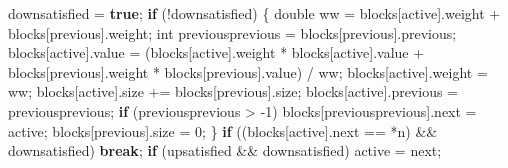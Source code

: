 \documentclass[
  12pt,
  letterpaper,
  DIV=11,
  numbers=noendperiod]{scrreprt}
\newenvironment{Shaded}{\begin{snugshade}}{\end{snugshade}}
\newcommand{\ControlFlowTok}[1]{\textcolor[rgb]{0.00,0.23,0.31}{\textbf{#1}}}
\newcommand{\DataTypeTok}[1]{\textcolor[rgb]{0.68,0.00,0.00}{#1}}
\newcommand{\DecValTok}[1]{\textcolor[rgb]{0.68,0.00,0.00}{#1}}
\newcommand{\KeywordTok}[1]{\textcolor[rgb]{0.00,0.23,0.31}{\textbf{#1}}}
\newcommand{\NormalTok}[1]{\textcolor[rgb]{0.00,0.23,0.31}{#1}}
\newcommand{\OperatorTok}[1]{\textcolor[rgb]{0.37,0.37,0.37}{#1}}
\theoremstyle{remark}
\begin{document}
\begin{Shaded}
\begin{Highlighting}[]
\NormalTok{            downsatisfied }\OperatorTok{=} \KeywordTok{true}\OperatorTok{;}
        \ControlFlowTok{if} \OperatorTok{(!}\NormalTok{downsatisfied}\OperatorTok{)} \OperatorTok{\{}
            \DataTypeTok{double}\NormalTok{ ww }\OperatorTok{=}\NormalTok{ blocks}\OperatorTok{[}\NormalTok{active}\OperatorTok{].}\NormalTok{weight }\OperatorTok{+}\NormalTok{ blocks}\OperatorTok{[}\NormalTok{previous}\OperatorTok{].}\NormalTok{weight}\OperatorTok{;}
            \DataTypeTok{int}\NormalTok{ previousprevious }\OperatorTok{=}\NormalTok{ blocks}\OperatorTok{[}\NormalTok{previous}\OperatorTok{].}\NormalTok{previous}\OperatorTok{;}
\NormalTok{            blocks}\OperatorTok{[}\NormalTok{active}\OperatorTok{].}\NormalTok{value }\OperatorTok{=}
                \OperatorTok{(}\NormalTok{blocks}\OperatorTok{[}\NormalTok{active}\OperatorTok{].}\NormalTok{weight }\OperatorTok{*}\NormalTok{ blocks}\OperatorTok{[}\NormalTok{active}\OperatorTok{].}\NormalTok{value }\OperatorTok{+}
\NormalTok{                 blocks}\OperatorTok{[}\NormalTok{previous}\OperatorTok{].}\NormalTok{weight }\OperatorTok{*}\NormalTok{ blocks}\OperatorTok{[}\NormalTok{previous}\OperatorTok{].}\NormalTok{value}\OperatorTok{)} \OperatorTok{/}
\NormalTok{                ww}\OperatorTok{;}
\NormalTok{            blocks}\OperatorTok{[}\NormalTok{active}\OperatorTok{].}\NormalTok{weight }\OperatorTok{=}\NormalTok{ ww}\OperatorTok{;}
\NormalTok{            blocks}\OperatorTok{[}\NormalTok{active}\OperatorTok{].}\NormalTok{size }\OperatorTok{+=}\NormalTok{ blocks}\OperatorTok{[}\NormalTok{previous}\OperatorTok{].}\NormalTok{size}\OperatorTok{;}
\NormalTok{            blocks}\OperatorTok{[}\NormalTok{active}\OperatorTok{].}\NormalTok{previous }\OperatorTok{=}\NormalTok{ previousprevious}\OperatorTok{;}
            \ControlFlowTok{if} \OperatorTok{(}\NormalTok{previousprevious }\OperatorTok{\textgreater{}} \OperatorTok{{-}}\DecValTok{1}\OperatorTok{)}\NormalTok{ blocks}\OperatorTok{[}\NormalTok{previousprevious}\OperatorTok{].}\NormalTok{next }\OperatorTok{=}\NormalTok{ active}\OperatorTok{;}
\NormalTok{            blocks}\OperatorTok{[}\NormalTok{previous}\OperatorTok{].}\NormalTok{size }\OperatorTok{=} \DecValTok{0}\OperatorTok{;}
        \OperatorTok{\}}
        \ControlFlowTok{if} \OperatorTok{((}\NormalTok{blocks}\OperatorTok{[}\NormalTok{active}\OperatorTok{].}\NormalTok{next }\OperatorTok{==} \OperatorTok{*}\NormalTok{n}\OperatorTok{)} \OperatorTok{\&\&}\NormalTok{ downsatisfied}\OperatorTok{)} \ControlFlowTok{break}\OperatorTok{;}
        \ControlFlowTok{if} \OperatorTok{(}\NormalTok{upsatisfied }\OperatorTok{\&\&}\NormalTok{ downsatisfied}\OperatorTok{)}\NormalTok{ active }\OperatorTok{=}\NormalTok{ next}\OperatorTok{;}

\end{Highlighting}
\end{Shaded}
\end{document}
